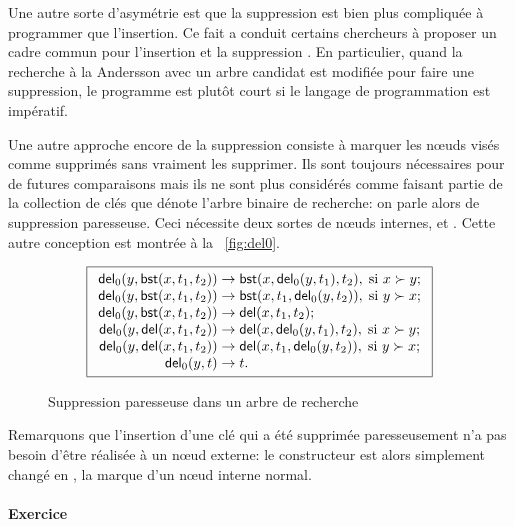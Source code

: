 Une autre sorte d'asymétrie est que la suppression est bien plus
compliquée à programmer que l'insertion. Ce fait a conduit certains
chercheurs à proposer un cadre commun pour l'insertion et la
suppression \citep{Andersson_1991,Hinze_2002}. En particulier, quand
la recherche à la Andersson avec un arbre candidat est modifiée pour
faire une suppression, le programme est plutôt court si le langage de
programmation est impératif.

Une autre approche encore de la suppression consiste à marquer les
nœuds visés comme supprimés sans vraiment les supprimer. Ils sont
toujours nécessaires pour de futures comparaisons mais ils ne sont
plus considérés comme faisant partie de la collection de clés que
dénote l'arbre binaire de recherche: on parle alors de suppression
paresseuse. Ceci nécessite deux sortes de nœuds internes, 
et . Cette autre conception est
montrée à la \fig~\vref{fig:del0}.
\begin{figure}
\begin{equation*}
\boxed{
\begin{array}{r@{\;}l@{\;}l}
  \fun{del}_0(y,\fun{bst}(x,t_1,t_2)) & \rightarrow &
  \fun{bst}(x,\fun{del}_0(y,t_1),t_2),\; \text{si \(x \succ y\)};\\
\fun{del}_0(y,\fun{bst}(x,t_1,t_2)) & \rightarrow &
  \fun{bst}(x,t_1,\fun{del}_0(y,t_2)),\; \text{si \(y \succ x\)};\\
\fun{del}_0(y,\fun{bst}(x,t_1,t_2)) & \rightarrow &
  \fun{del}(x,t_1,t_2);\\
\fun{del}_0(y,\fun{del}(x,t_1,t_2)) & \rightarrow &
  \fun{del}(x,\fun{del}_0(y,t_1),t_2),\; \text{si \(x \succ y\)};\\
\fun{del}_0(y,\fun{del}(x,t_1,t_2)) & \rightarrow &
  \fun{del}(x,t_1,\fun{del}_0(y,t_2)),\; \text{si \(y \succ x\)};\\
\fun{del}_0(y,t) & \rightarrow & t.\\
\end{array}}
\end{equation*}
\caption{Suppression paresseuse dans un arbre de recherche}
\label{fig:del0}
\end{figure}
Remarquons que l'insertion d'une clé qui a été supprimée
paresseusement n'a pas besoin d'être réalisée à un nœud externe:
le constructeur  est alors simplement changé en
, la marque d'un nœud interne normal.

\paragraph{Exercice}

